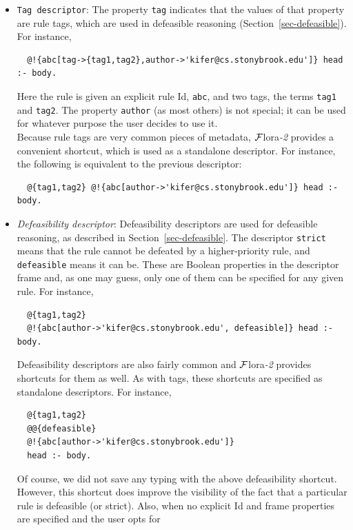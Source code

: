 \documentclass[11pt]{article}
\newcommand{\FLSYSTEM}{{\mbox{\sc ${\cal F}${lora}\rm\emph{-2}}}\xspace}
\begin{document}
\begin{itemize}
\item \texttt{Tag descriptor}:
  The property \texttt{tag} indicates that the values of that property are
  rule tags, which are used in defeasible reasoning
  (Section~\ref{sec-defeasible}). For instance,
\begin{verbatim}
  @!{abc[tag->{tag1,tag2},author->'kifer@cs.stonybrook.edu']} head :- body.  
\end{verbatim}
  Here the rule is given an explicit rule Id, \texttt{abc}, and
  two tags, the terms \texttt{tag1} and
  \texttt{tag2}. The
  property \texttt{author} (as most others) is not special; it can be used
  for whatever purpose the user decides to use it.
  \\
  Because rule tags are very common pieces of metadata, \FLSYSTEM provides a
  convenient shortcut, which is used as a standalone descriptor. For
  instance, the following is equivalent to the previous descriptor:
\begin{verbatim}
  @{tag1,tag2} @!{abc[author->'kifer@cs.stonybrook.edu']} head :- body.
\end{verbatim}
\item \emph{Defeasibility descriptor}:
  Defeasibility descriptors are used for defeasible
  reasoning, as described in Section~\ref{sec-defeasible}. The descriptor
  \texttt{strict} means that the rule cannot be defeated by a
  higher-priority rule, and \texttt{defeasible} means it can be. These are
  Boolean properties in the descriptor frame and, as one may guess, only
  one of them can be specified for any given rule. For instance,
\begin{verbatim}
  @{tag1,tag2}
  @!{abc[author->'kifer@cs.stonybrook.edu', defeasible]} head :- body.
\end{verbatim}
  Defeasibility descriptors are also fairly common and \FLSYSTEM provides shortcuts for
  them as well. As with tags, these shortcuts are specified as standalone
  descriptors. For instance,
\begin{verbatim}
  @{tag1,tag2}
  @@{defeasible}
  @!{abc[author->'kifer@cs.stonybrook.edu']}
  head :- body.
\end{verbatim}
  Of course, we did not save any typing with the above defeasibility
  shortcut. However, this shortcut does improve the visibility of
  the fact that a particular rule is defeasible (or strict). Also, when no
  explicit Id and frame properties are specified and the user opts for

\end{itemize}
\end{document}
